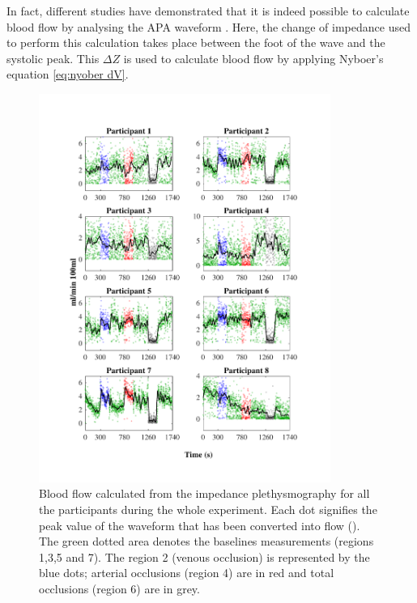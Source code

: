In fact, different studies have demonstrated that it is indeed possible to calculate blood flow by analysing the APA waveform \cite{costeloe1980continuous, yamakoshi1980limb, porter1985measurement, corciova2011peripheral, brown1975impedance, marks1985computer}. Here, the change of impedance used to perform this calculation takes place between the foot of the wave and the systolic peak. This $\Delta Z$ is used to calculate blood flow by applying Nyboer's equation \ref{eq:nyober dV}.

\begin{figure}[!htbp]
	\centering
	\includegraphics[width=0.85\textwidth,trim={1.5cm 0.5cm 1.5cm 1.5cm},clip]{figure_apa_8}
	\caption[Blood flow calculated from the impedance plethysmography waveform at the time of the whole expetiment]{Blood flow calculated from the impedance plethysmography for all the participants during the whole experiment. Each dot signifies the peak value of the waveform that has been converted into flow (\si{\bfv}). The green dotted area denotes the baselines measurements (regions 1,3,5 and 7). The region 2 (venous occlusion) is represented by the blue dots; arterial occlusions (region 4) are in red and total occlusions (region 6) are in grey.}
	\label{fig:blood_flow_plethysmography}
\end{figure}

